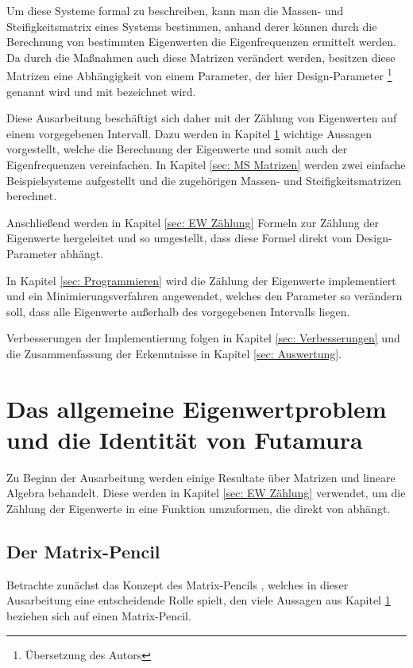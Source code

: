 \documentclass[a4paper,12pt]{report}
\newcommand{\zitat}[1]{\glqq #1\grqq}
\newcommand{\1}{\mathds{1}}
\theoremstyle{plain} %
\theoremstyle{definition} %
\theoremstyle{remark}
\begin{document}

      Um diese Systeme formal zu beschreiben, kann man die Massen- und Steifigkeitsmatrix eines Systems bestimmen, anhand derer können durch die Berechnung von bestimmten Eigenwerten die Eigenfrequenzen ermittelt werden.
      Da durch die Maßnahmen auch diese Matrizen verändert werden, besitzen diese Matrizen eine Abhängigkeit von einem Parameter, der hier \zitat{Design-Parameter} \cite[S. 2]{hauptteilTkachuk}\footnote{Übersetzung des Autors} genannt wird und mit \s bezeichnet wird.

      Diese Ausarbeitung beschäftigt sich daher mit der Zählung von Eigenwerten auf einem vorgegebenen Intervall. Dazu werden in Kapitel \ref{sec: EW Problem_Futamura} wichtige Aussagen vorgestellt, welche die Berechnung der Eigenwerte und somit auch der Eigenfrequenzen vereinfachen.
      In Kapitel \ref{sec: MS Matrizen} werden zwei einfache Beispielsysteme aufgestellt und die zugehörigen Massen- und Steifigkeitsmatrizen berechnet.

      Anschließend werden in Kapitel \ref{sec: EW Zählung} Formeln zur Zählung der Eigenwerte hergeleitet und so umgestellt, dass diese Formel direkt vom Design-Parameter \s abhängt.

      In Kapitel \ref{sec: Programmieren} wird die Zählung der Eigenwerte implementiert und ein Minimierungsverfahren angewendet, welches den Parameter \s so verändern soll, dass alle Eigenwerte außerhalb des vorgegebenen Intervalls liegen.

      Verbesserungen der Implementierung folgen in Kapitel \ref{sec: Verbesserungen} und die Zusammenfassung der Erkenntnisse in Kapitel \ref{sec: Auswertung}.

\chapter{Das allgemeine Eigenwertproblem und die Identität von Futamura}
\label{sec: EW Problem_Futamura}

      Zu Beginn der Ausarbeitung werden einige Resultate über Matrizen und lineare Algebra behandelt.
      Diese werden in Kapitel \ref{sec: EW Zählung} verwendet, um die Zählung der Eigenwerte in eine Funktion \J umzuformen, die direkt von \s abhängt.
      
      \section{Der Matrix-Pencil}
            Betrachte zunächst das Konzept des \zitat{Matrix-Pencils} \cite[S. 32]{matrixPencilDeutsch}, welches in dieser Ausarbeitung eine entscheidende Rolle spielt,
            den viele Aussagen aus Kapitel \ref{sec: EW Problem_Futamura} beziehen sich auf einen Matrix-Pencil.
      
\end{document}
